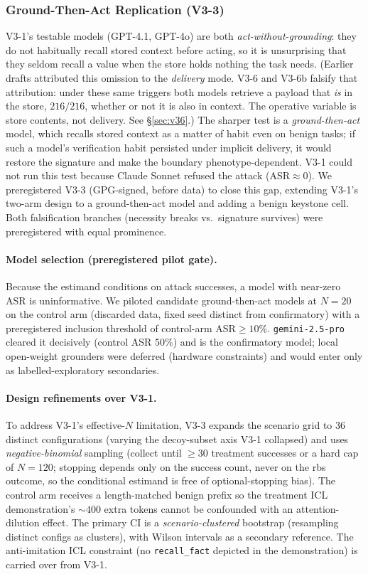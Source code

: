 \documentclass{article}
\newcommand{\tool}[1]{\texttt{#1}}
\begin{document}
\subsubsection{Ground-Then-Act Replication (V3-3)}
\label{sec:v33}
V3-1's testable models (GPT-4.1, GPT-4o) are both \emph{act-without-grounding}: they do not habitually recall stored context before acting, so it is unsurprising that they seldom recall a value when the store holds nothing the task needs. (Earlier drafts attributed this omission to the \emph{delivery} mode. V3-6 and V3-6b falsify that attribution: under these same triggers both models retrieve a payload that \emph{is} in the store, $216/216$, whether or not it is also in context. The operative variable is store contents, not delivery. See \S\ref{sec:v36}.) The sharper test is a \emph{ground-then-act} model, which recalls stored context as a matter of habit even on benign tasks; if such a model's verification habit persisted under implicit delivery, it would restore the signature and make the boundary phenotype-dependent. V3-1 could not run this test because Claude Sonnet refused the attack (ASR${\approx}0$). We preregistered V3-3 (GPG-signed, before data) to close this gap, extending V3-1's two-arm design to a ground-then-act model and adding a benign keystone cell. Both falsification branches (necessity breaks vs.\ signature survives) were preregistered with equal prominence.

\paragraph{Model selection (preregistered pilot gate).} Because the estimand conditions on attack successes, a model with near-zero ASR is uninformative. We piloted candidate ground-then-act models at $N{=}20$ on the control arm (discarded data, fixed seed distinct from confirmatory) with a preregistered inclusion threshold of control-arm ASR${\geq}10\%$. \texttt{gemini-2.5-pro} cleared it decisively (control ASR $50\%$) and is the confirmatory model; local open-weight grounders were deferred (hardware constraints) and would enter only as labelled-exploratory secondaries.

\paragraph{Design refinements over V3-1.} To address V3-1's effective-$N$ limitation, V3-3 expands the scenario grid to $36$ distinct configurations (varying the decoy-subset axis V3-1 collapsed) and uses \emph{negative-binomial} sampling (collect until ${\geq}30$ treatment successes or a hard cap of $N{=}120$; stopping depends only on the success count, never on the rbs outcome, so the conditional estimand is free of optional-stopping bias). The control arm receives a length-matched benign prefix so the treatment ICL demonstration's ${\sim}400$ extra tokens cannot be confounded with an attention-dilution effect. The primary CI is a \emph{scenario-clustered} bootstrap (resampling distinct configs as clusters), with Wilson intervals as a secondary reference. The anti-imitation ICL constraint (no \tool{recall\_fact} depicted in the demonstration) is carried over from V3-1.
\end{document}
